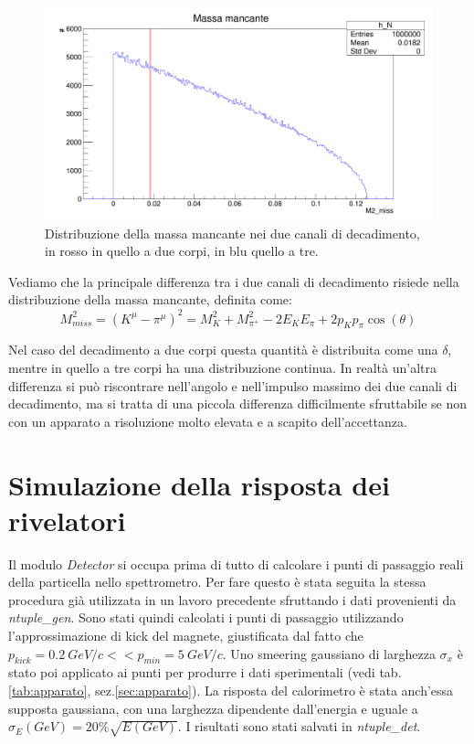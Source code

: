 \documentclass[8pt]{extarticle}
\begin{document}
\begin{figure}
\begin{center}
\includegraphics[scale=0.25]{gen_miss}
\caption{Distribuzione della massa mancante nei due canali di decadimento, in rosso in quello a due corpi, in blu quello a tre.}
\label{fig:gen_miss}
\end{center}
\end{figure}

Vediamo che la principale differenza tra i due canali di decadimento risiede nella distribuzione della massa mancante, definita come: \\
$$
M^2_{miss} = (K^{\mu} - \pi^{\mu})^2 = M^2_K +  M^2_{\pi^+} - 2E_K E_\pi + 2 p_K p_\pi \cos(\theta)
$$

Nel caso del decadimento a due corpi questa quantità è distribuita come una $\delta$, mentre in quello a tre corpi ha una distribuzione continua. 
In realtà un'altra differenza si può riscontrare nell'angolo e nell'impulso massimo dei due canali di decadimento, ma si tratta di una piccola differenza difficilmente sfruttabile se non con un apparato a risoluzione molto elevata e a scapito dell'accettanza. 

\section{Simulazione della risposta dei rivelatori} \label{sec:detector}
Il modulo \textit{Detector} si occupa prima di tutto di calcolare i punti di passaggio reali della particella nello spettrometro. Per fare questo è stata seguita la stessa procedura già utilizzata in un lavoro precedente\cite{spettrometro} sfruttando i dati provenienti da \textit{ntuple\_gen}. Sono stati quindi calcolati i punti di passaggio utilizzando l'approssimazione di kick del magnete, giustificata dal fatto che $p_{kick} = 0.2\ GeV/c << p_{min} = 5\ GeV/c$. Uno smeering gaussiano di larghezza $\sigma_x$ è stato poi applicato ai punti per produrre i dati sperimentali (vedi tab.\ref{tab:apparato}, sez.\ref{sec:apparato}). La risposta del calorimetro è stata anch'essa supposta gaussiana, con una larghezza dipendente dall'energia e uguale a $\sigma_E (GeV) = 20\% \sqrt{E(GeV)}$. I risultati sono stati salvati in \textit{ntuple\_det}.
\end{document}

